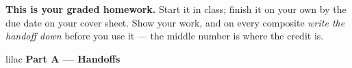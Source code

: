 \documentclass[10pt]{article}
\begin{document}

\vspace{0.1in}

\boxguard[8]
\begin{remindbox}
\small
\textbf{This is your graded homework.} Start it in class; finish it on your own by the due
date on your cover sheet. Show your work, and on every composite \emph{write the handoff down}
before you use it --- the middle number is where the credit is.
\end{remindbox}

\vspace{0.1in}

\begin{headlinebox}{lilac}
\textbf{\color{plum}Part A --- Handoffs}
\end{headlinebox}
\end{document}

